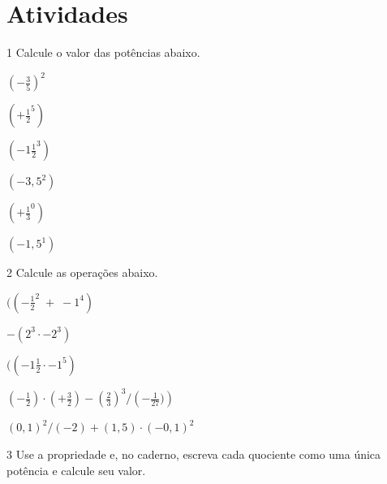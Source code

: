 \section{Atividades}

\num{1} Calcule o valor das potências abaixo.

\begin{escolha}[itemsep=0pt]
\item $\left( - \frac{3}{5}\right )^2$  
\item $( + \frac{1}{2}^5)$  
\item $( - 1\frac{1}{2}^3)$  
\item $( -3,5^2)$  
\item $( + \frac{1}{3}^0)$  
\item $(-1,5^1)$  
\end{escolha}


\num{2} Calcule as operações abaixo.

\begin{escolha}[itemsep=0pt]
\item $(( - \frac{1}{2}^2 \; + \; -1^4)$ 
\item $ - (2^3 \cdot -2^3)$ 
\item $(( - 1\frac{1}{2} \cdot -1^5)$ 
\item $\left ( - \frac{1}{2} \right) \cdot \left( + \frac{3}{2} \right) - \left ( \frac{2}{3} \right)^{3} / \left ( - \frac{1}{27}) \right)$  
\item $(0,1) ^2 / (-2) + (1,5) \cdot (-0,1)^2$ 
\end{escolha}







\num{3} Use a propriedade e, no caderno, escreva cada quociente como uma
única potência e calcule seu valor.


